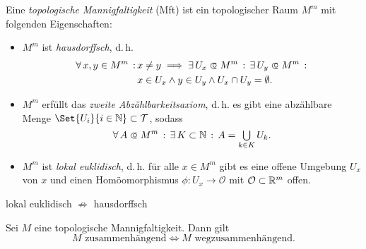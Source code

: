 \documentclass{cheat-sheet}
\newcommand{\Tau}{\mathcal{T}} %
\renewcommand{\O}{\mathcal{O}} %
\begin{document}


\begin{defn}
  Eine \emph{topologische Mannigfaltigkeit} (Mft) ist ein topologischer Raum $M^m$ mit folgenden Eigenschaften:
  \begin{itemize}
    \item $M^m$ ist \emph{hausdorffsch}, d.\,h.
    \begin{align*}
      \fa{x, y \in M^m} &x \not= y \implies \ex{U_x \opn M^m} \ex{U_y \opn M^m}\\
      &x \in U_x \wedge y \in U_y \wedge U_x \cap U_y = \emptyset.
    \end{align*}
    \item $M^m$ erfüllt das \emph{zweite Abzählbarkeitsaxiom}, d.\,h. es gibt eine abzählbare Menge $\Set{ U_i }{ i \in \N } \subset \Tau$, sodass
    \[ \fa{A \opn M^m} \ex{K \subset \N} A = \bigcup_{k \in K} U_k. \]
    \item $M^m$ ist \emph{lokal euklidisch}, d.\,h. für alle $x \in M^m$ gibt es eine offene Umgebung $U_x$ von $x$ und einen Homöomorphismus $\phi : U_x \to \O$ mit $\O \subset \R^m$ offen.
  \end{itemize}
\end{defn}

\begin{bem}
  lokal euklidisch $\not\Rightarrow$ hausdorffsch
\end{bem}

\begin{prop}
  Sei $M$ eine topologische Mannigfaltigkeit. Dann gilt
  \[ \text{$M$ zusammenhängend} \iff \text{$M$ wegzusammenhängend.} \]
\end{prop}
\end{document}
